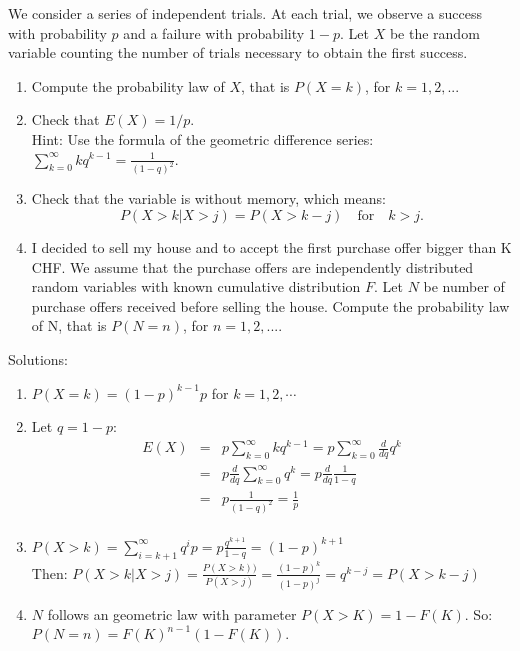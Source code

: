\documentclass[12pt,thmsa]{article}\usepackage[]{graphicx}\usepackage[]{color}
\begin{document}
We consider a series of independent trials. At each trial, we observe a success with probability $p$ and a failure with probability $1-p$. Let $X$ be the random variable counting the number of trials necessary to
obtain the first success.
\begin{enumerate}
  \item Compute the probability law of $X$, that is $P(X=k)$, for $k=1,2,..$.
  \item Check that $E(X)=1/p$. \\
  Hint: Use the formula of the geometric difference series: $\sum_{k=0}^\infty k q^{k-1}=\frac{1}{(1-q)^2}$.
  \item Check that the variable is without memory, which means:
  \begin{equation*}
    P(X>k\vert X>j)=P(X>k-j) \quad \text{for} \quad k>j.
  \end{equation*}
  \item I decided to sell my house and to accept the first purchase offer bigger than K CHF. We assume that the purchase offers are independently distributed random variables
  with known cumulative distribution $F$. Let $N$ be number of purchase offers received before selling the house.
  Compute the probability law of N, that is $P(N=n)$, for $n=1,2,...$.
\end{enumerate}
\noindent Solutions:
\begin{enumerate}
  \item $P(X=k)= (1-p)^{k-1}p$ \quad for $k=1,2,\cdots $
  \item  Let $q=1-p$:\begin{eqnarray*}
  E(X) &=& p \sum_{k=0}^{\infty} k q^{k-1} = p \sum_{k=0}^{\infty} \frac{d}{dq} q^k \\
   &=& p \frac{d}{dq} \sum_{k=0}^{\infty} q^k = p \frac{d}{dq} \frac{1}{1-q}  \\
   &=& p  \frac{1}{(1-q)^2}=\frac{1}{p}  \\
\end{eqnarray*}
  \item  $P(X>k)=\sum_{i=k+1}^\infty q^i p=p \frac{q^{k+1}}{1-q}=(1-p)^{k+1}$\\
  Then: $P(X>k\vert X>j)=\frac{P(X>k))}{P(X>j)}=\frac{(1-p)^{k}}{(1-p)^{j}}=q^{k-j}=P(X>k-j)$
  \item $N$ follows an geometric law with parameter $P(X>K)=1-F(K)$.
  So: $P(N=n)=F(K)^{n-1} (1-F(K))$.
\end{enumerate}
\end{document}
